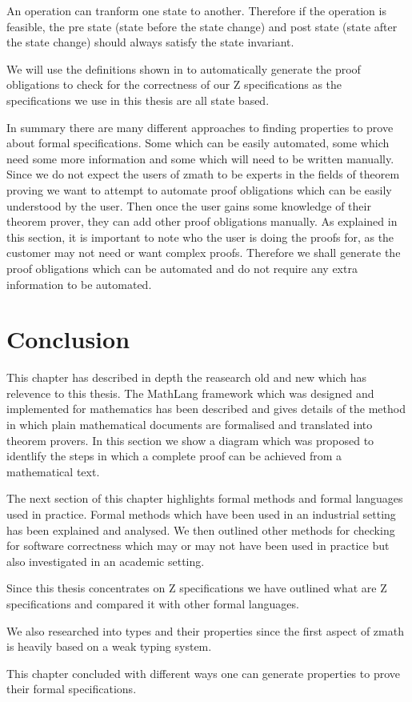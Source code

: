 An operation can tranform one state to another. Therefore if the operation is feasible, the pre state (state before the state change) and post state (state after the state change) should always satisfy the state invariant. 

We will use the definitions shown in \cite{DBLP:conf/icsea/WenMZ06} to automatically generate the proof obligations to check for the correctness of our Z specifications as the specifications we use in this thesis are all state based.

In summary there are many different approaches to finding properties to prove about formal specifications. Some which can be easily automated, some which need some more information and some which will need to be written manually. Since we do not expect the users of \gls{zmath} to be experts in the fields of theorem proving we want to attempt to automate proof obligations which can be easily understood by the user. Then once the user gains some knowledge of their theorem prover, they can add other proof obligations manually. As explained in this section, it is important to note who the user is doing the proofs for, as the customer may not need or want complex proofs. Therefore we shall generate the proof obligations which can be automated and do not require any extra information to be automated.

\section{Conclusion}
This chapter has described in depth the reasearch old and new which has relevence to this thesis. The MathLang framework which was designed and implemented for mathematics has been described and gives details of the method in which plain mathematical documents are formalised and translated into theorem provers. In this section we show a diagram which was proposed to identlify the steps in which a complete proof can be achieved from a mathematical text. 

The next section of this chapter highlights formal methods and formal languages used in practice. Formal methods which have been used in an industrial setting has been explained and analysed. We then outlined other methods for checking for software correctness which may or may not have been used in practice but also investigated in an academic setting.

Since this thesis concentrates on Z specifications we have outlined what are Z specifications and compared it with other formal languages. 

We also researched into types and their properties since the first aspect of \gls{zmath} is heavily based on a weak typing system.

This chapter concluded with different ways one can generate properties to prove their formal specifications.